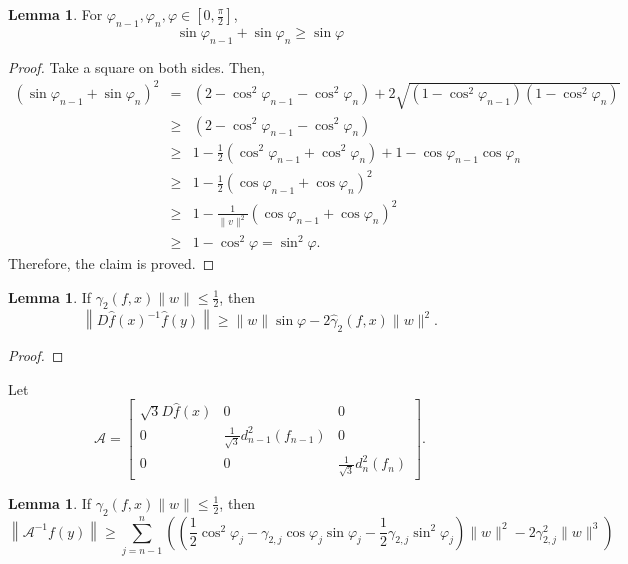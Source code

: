 \documentclass[12pt,oneside,reqno]{amsart}
\theoremstyle{definition}
\newtheorem{lem}[thm]{Lemma}
\begin{document}
\begin{lem}
	For $\varphi_{n-1},\varphi_n,\varphi \in [0,\frac{\pi}{2}]$,
	\[\sin\varphi_{n-1}+\sin\varphi_n\geq \sin \varphi\]
\end{lem}
\begin{proof}
	Take a square on both sides. Then,
	\begin{eqnarray*}
	\left(\sin\varphi_{n-1}+\sin\varphi_n\right)^2& = & \left(2-\cos^2\varphi_{n-1}-\cos^2\varphi_n\right)+2\sqrt{\left(1-\cos^2\varphi_{n-1}\right)\left(1-\cos^2\varphi_n\right)}\\
	&\geq & \left(2-\cos^2\varphi_{n-1}-\cos^2\varphi_n\right)\\
	& \geq & 1-\frac{1}{2}\left(\cos^2\varphi_{n-1}+\cos^2\varphi_n\right)+1-\cos\varphi_{n-1}\cos\varphi_n\\
	& \geq & 1-\frac{1}{2}\left(\cos\varphi_{n-1}+\cos\varphi_n\right)^2\\
	& \geq & 1-\frac{1}{\|v\|^2}\left(\cos\varphi_{n-1}+\cos\varphi_n\right)^2\\
	&\geq & 1-\cos^2\varphi=\sin^2\varphi.
	\end{eqnarray*}
	Therefore, the claim is proved.
\end{proof}
\begin{lem}\cite[Lemma 1]{hao2017computing}
	If $\gamma_2(f,x)\|w\|\leq \frac{1}{2}$, then
	\[\left\|D\hat{f}(x)^{-1}\hat{f}(y)\right\|\geq \|w\|\sin\varphi -2\hat{\gamma}_2(f,x)\|w\|^2.\]
\end{lem}
\begin{proof}
	
\end{proof}
Let 
\[\mathcal{A}=\begin{bmatrix}
\sqrt{3}D\hat{f}(x) & 0 & 0\\
0 & \frac{1}{\sqrt{3}}d_{n-1}^2(f_{n-1}) & 0 \\
0 & 0 & \frac{1}{\sqrt{3}}d_{n}^2(f_{n})
\end{bmatrix}.\]
\begin{lem}
	If $\gamma_2(f,x)\|w\|\leq \frac{1}{2}$, then 
	\[\left\|\mathcal{A}^{-1}f(y)\right\|\geq \sum\limits_{j=n-1}^n\left(\left(\frac{1}{2}\cos^2\varphi_{j}-\gamma_{2,j}\cos\varphi_j\sin\varphi_j-\frac{1}{2}\gamma_{2,j}\sin^2\varphi_j\right)\|w\|^2 -2\gamma_{2,j}^2\|w\|^3\right)\]
\end{lem}
\end{document}
